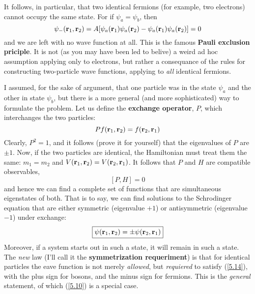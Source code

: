 It follows, in particular, that two identical fermions (for example, two electrons) cannot occupy the same state. For if $\psi_a=\psi_b$, then $$\psi_-(\vb{r}_1,\vb{r}_2) = A[\psi_a(\vb{r}_1)\psi_a(\vb{r}_2)-\psi_a(\vb{r}_1)\psi_a(\vb{r}_2)] = 0$$ and we are left with no wave function at all. This is the famous \textbf{Pauli exclusion priciple}. It is not (as you may have been led to belive) a weird ad hoc assumption applying only to electrons, but rather a consequance of the rules for constructing two-particle wave functions, applying to \textit{all} identical fermions.

I assumed, for the sake of argument, that one particle was in the state $\psi_a$ and the other in state $\psi_b$, but there is a more general (and more sophisticated) way to formulate the problem. Let us define the \textbf{exchange operator}, $P$, which interchanges the two particles:
\begin{equation}\label{5.12}
	Pf(\vb{r}_1,\vb{r}_2) = f(\vb{r}_2,\vb{r}_1)
\end{equation}
Clearly, $P^2=1$, and it follows (prove it for yourself) that the eigenvalues of $P$ are $\pm 1$. Now, if the two particles are identical, the Hamiltonian must treat them the same: $m_1=m_2$ and $V(\vb{r}_1,\vb{r}_2)=V(\vb{r}_2,\vb{r}_1)$. It follows that $P$ and $H$ are compatible observables,
\begin{equation}\label{5.13}
	[P,H]=0
\end{equation}
and hence we can find a complete set of functions that are simultaneous eigenstates of both. That is to say, we can find solutions to the Schrodinger equation that are either symmetric (eigenvalue $+1$) or antisymmetric (eigenvalue $-1$) under exchange:
\begin{equation}\label{5.14}
	\boxed{\psi(\vb{r}_1,\vb{r}_2) = \pm\psi(\vb{r}_2,\vb{r}_1)}
\end{equation}
Moreover, if a system starts out in such a state, it will remain in such a state. The \textit{new} law (I'll call it the \textbf{symmetrization requeriment}) is that for identical particles the eave function is not merely \textit{allowed}, but \textit{requiered} to satisfy (\ref{5.14}), with the plus sign for bosons, and the minus sign for fermions. This is the \textit{general} statement, of which (\ref{5.10}) is a special case.













